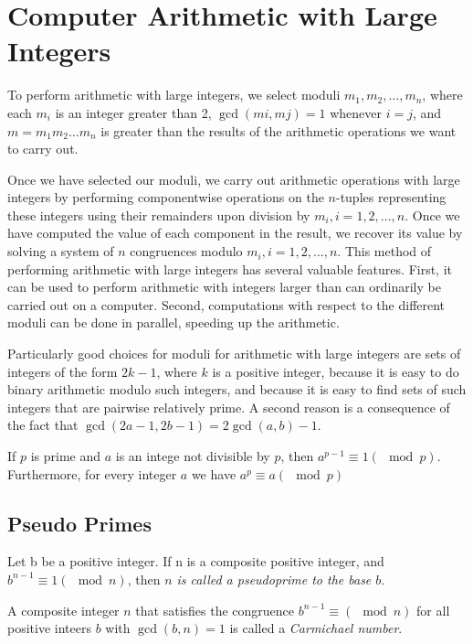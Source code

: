 \section {Computer Arithmetic with Large Integers}

To perform arithmetic with large integers, we select moduli $m_1,m_2,\dots , m_n$, where each $m_i$
is an integer greater than 2, $\gcd(mi,mj ) = 1$ whenever $i= j$, and $m=m_1m_2\dots m_n$ is greater
than the results of the arithmetic operations we want to carry out.

Once we have selected our moduli, we carry out arithmetic operations with large integers by
performing componentwise operations on the $n$-tuples representing these integers using their
remainders upon division by $m_i, i = 1, 2, . . . , n$. Once we have computed the value of each
component in the result, we recover its value by solving a system of $n$ congruences modulo
$m_i, i = 1, 2, . . . , n$. This method of performing arithmetic with large integers has several valuable
features. First, it can be used to perform arithmetic with integers larger than can ordinarily
be carried out on a computer. Second, computations with respect to the different moduli can be
done in parallel, speeding up the arithmetic.

Particularly good choices for moduli for arithmetic with large integers are sets of integers of
the form $2k-1$, where $k$ is a positive integer, because it is easy to do binary arithmetic modulo
such integers, and because it is easy to find sets of such integers that are pairwise relatively prime.
A second reason is a consequence of the fact that $\gcd(2a-1,2b-1)=2\gcd(a, b)-1$. 


\begin{theorem}
If $p$ is prime and $a$ is an intege not divisible by $p$, then
$a^{p-1} \equiv 1 (\mod p).$
Furthermore, for every integer $a$ we have
$a^p \equiv a(\mod p)$
\end{theorem}

  \subsection{Pseudo Primes}
\begin{definition}
Let b be a positive integer. If n is a composite positive integer, and $b^{n-1} \equiv 1 (\mod n)$, then
\textit{$n$ is called a pseudoprime to the base $b$}.
\end{definition}

\begin{definition}
A composite integer $n$ that satisfies the congruence $b^{n-1} \equiv (\mod n)$ for all positive inteers $b$ with $\gcd(b,n)=1$ is called a \textit{Carmichael number}. 
\end{definition}

